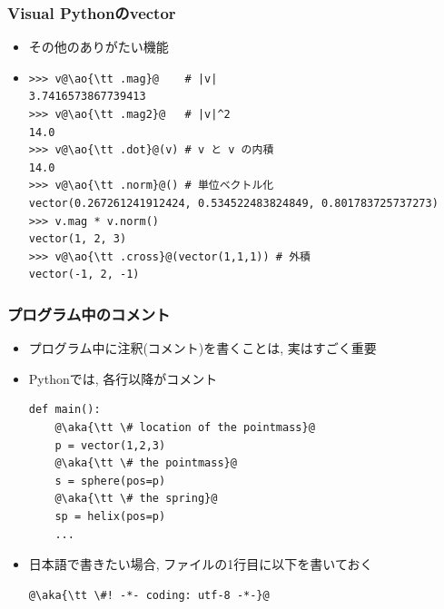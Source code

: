 \documentclass[10pt,dvipdfmx]{beamer}
\newcommand{\ao}[1]{{\color{blue}#1}}
\newcommand{\aka}[1]{{\color{red}#1}}
\begin{document}
\begin{frame}[fragile]
\frametitle{Visual Pythonのvector}
\begin{itemize}
\item その他のありがたい機能
\item []
\begin{lstlisting}
>>> v@\ao{\tt .mag}@    # |v|
3.7416573867739413
>>> v@\ao{\tt .mag2}@   # |v|^2
14.0
>>> v@\ao{\tt .dot}@(v) # v と v の内積
14.0
>>> v@\ao{\tt .norm}@() # 単位ベクトル化
vector(0.267261241912424, 0.534522483824849, 0.801783725737273)
>>> v.mag * v.norm()
vector(1, 2, 3)
>>> v@\ao{\tt .cross}@(vector(1,1,1)) # 外積
vector(-1, 2, -1)
\end{lstlisting}
\end{itemize}
\end{frame}

\begin{frame}[fragile]
\frametitle{プログラム中のコメント}
\begin{itemize}
\item プログラム中に注釈(コメント)を書くことは,
実はすごく重要
\item Pythonでは, 各行\aka{{\tt \#}以降}がコメント
\begin{lstlisting}
def main():
    @\aka{\tt \# location of the pointmass}@
    p = vector(1,2,3)
    @\aka{\tt \# the pointmass}@
    s = sphere(pos=p)
    @\aka{\tt \# the spring}@
    sp = helix(pos=p)
    ...
\end{lstlisting}

\item 日本語で書きたい場合,
ファイルの1行目に以下を書いておく
\begin{lstlisting}
@\aka{\tt \#! -*- coding: utf-8 -*-}@
\end{lstlisting}
\end{itemize}

\end{frame}
\end{document}
